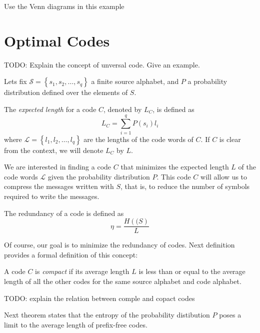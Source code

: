 {\color{red} Use the Venn diagrams in this example}

\begin{example}
\end{example}

%
%

\section{Optimal Codes}
\label{sec:Optimal-Codes}

{\color{red} TODO: Explain the concept of unversal code. Give an example.}

Lets fix $\mathcal{S}=\left\{ s_{1},s_{2},\ldots,s_{q}\right\}$ a finite source alphabet, and $P$ a probability distribution defined over the elements of $S$.

\begin{definition}
The \emph{expected length} for a code $C$, denoted by $L_{C}$, is defined as
\[
L_{C} = \sum_{i=1}^{q} P(s_{i})l_{i}
\]
where $\mathcal{L} = \left\{ l_{1},l_{2},\ldots,l_{q}\right\}$ are the lengths of the code words of $C$. If $C$ is clear from the context, we will denote $L_{C}$ by $L$.
\end{definition}

We are interested in finding a code $C$ that minimizes the expected length $L$ of the code words $\mathcal{L}$ given the probability distribution $P$. This code $C$ will allow us to compress the messages written with $S$, that is, to reduce the number of symbols required to write the messages.

\begin{definition}
The redundancy of a code is defined as
\[
\eta = \frac{H(\mathcal(S)}{L}
\]
\end{definition}

Of course, our goal is to minimize the redundancy of codes. Next definition provides a formal definition of this concept:

\begin{definition}
A code $C$ is \emph{compact} if its average length $L$ is less than or equal to the average length of all the other codes for the same source alphabet and code alphabet.
\end{definition}

{\color{red} TODO: explain the relation between comple and copact codes}

Next theorem states that the entropy of the probability distibution $P$ poses a limit to the average length of prefix-free codes.

